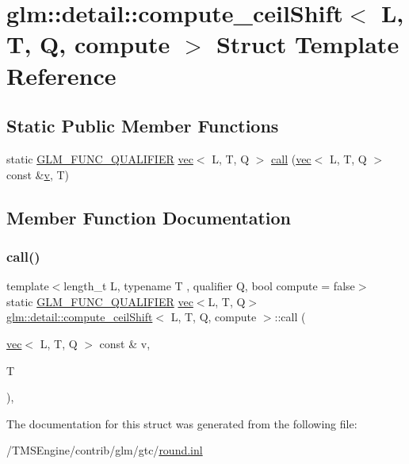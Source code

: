 \hypertarget{structglm_1_1detail_1_1compute__ceil_shift}{}\section{glm\+:\+:detail\+:\+:compute\+\_\+ceil\+Shift$<$ L, T, Q, compute $>$ Struct Template Reference}
\label{structglm_1_1detail_1_1compute__ceil_shift}
\subsection*{Static Public Member Functions}
\begin{DoxyCompactItemize}
\item 
static \hyperlink{setup_8hpp_a33fdea6f91c5f834105f7415e2a64407}{G\+L\+M\+\_\+\+F\+U\+N\+C\+\_\+\+Q\+U\+A\+L\+I\+F\+I\+ER} \hyperlink{structglm_1_1vec}{vec}$<$ L, T, Q $>$ \hyperlink{structglm_1_1detail_1_1compute__ceil_shift_a7ccb84201e15fd1ee3dfac02d3ffeb79}{call} (\hyperlink{structglm_1_1vec}{vec}$<$ L, T, Q $>$ const \&\hyperlink{_s_d_l__opengl_8h_a10a82eabcb59d2fcd74acee063775f90}{v}, T)
\end{DoxyCompactItemize}


\subsection{Member Function Documentation}
\mbox{\label{structglm_1_1detail_1_1compute__ceil_shift_a7ccb84201e15fd1ee3dfac02d3ffeb79}} 
\subsubsection{\texorpdfstring{call()}{call()}}
{\footnotesize\ttfamily template$<$length\+\_\+t L, typename T , qualifier Q, bool compute = false$>$ \\
static \hyperlink{setup_8hpp_a33fdea6f91c5f834105f7415e2a64407}{G\+L\+M\+\_\+\+F\+U\+N\+C\+\_\+\+Q\+U\+A\+L\+I\+F\+I\+ER} \hyperlink{structglm_1_1vec}{vec}$<$L, T, Q$>$ \hyperlink{structglm_1_1detail_1_1compute__ceil_shift}{glm\+::detail\+::compute\+\_\+ceil\+Shift}$<$ L, T, Q, compute $>$\+::call (\begin{DoxyParamCaption}\item[{\hyperlink{structglm_1_1vec}{vec}$<$ L, T, Q $>$ const \&}]{v,  }\item[{T}]{ }\end{DoxyParamCaption})\hspace{0.3cm}{\ttfamily [inline]}, {\ttfamily [static]}}



The documentation for this struct was generated from the following file\+:\begin{DoxyCompactItemize}
\item 
/\+T\+M\+S\+Engine/contrib/glm/gtc/\hyperlink{round_8inl}{round.\+inl}\end{DoxyCompactItemize}
